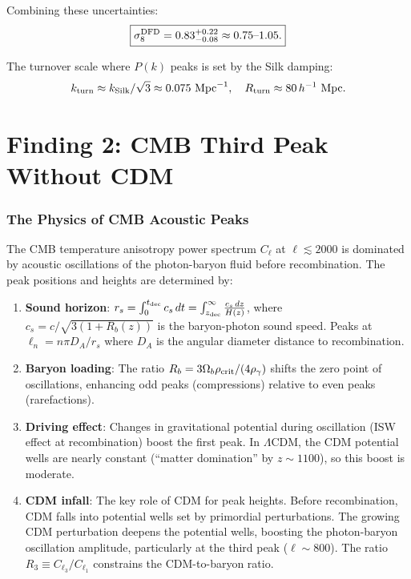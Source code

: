 \documentclass[11pt]{article}
\newcommand{\LCDM}{$\Lambda$CDM}
\newcommand{\kSilk}{k_{\rm Silk}}
\newcommand{\Ob}{\Omega_b}
\begin{document}
Combining these uncertainties:
\begin{equation}
\boxed{\sigma_8^{\rm DFD} = 0.83^{+0.22}_{-0.08}
\approx 0.75\text{--}1.05.}
\end{equation}

The turnover scale where $P(k)$ peaks is set by the Silk damping:
\begin{equation}
k_{\rm turn} \approx \kSilk/\sqrt{3} \approx 0.075\text{ Mpc}^{-1},
\quad R_{\rm turn} \approx 80\,h^{-1}\text{ Mpc}.
\end{equation}


\part{Finding 2: CMB Third Peak Without CDM}
\label{part:third-peak}

\section{The Physics of CMB Acoustic Peaks}

The CMB temperature anisotropy power spectrum $C_\ell$ at
$\ell \lesssim 2000$ is dominated by acoustic oscillations of the
photon-baryon fluid before recombination. The peak positions and
heights are determined by:

\begin{enumerate}
\item \textbf{Sound horizon}: $r_s = \int_0^{t_{\rm dec}} c_s\,dt
  = \int_{z_{\rm dec}}^\infty \frac{c_s\,dz}{H(z)}$, where
  $c_s = c/\sqrt{3(1+R_b(z))}$ is the baryon-photon sound speed.
  Peaks at $\ell_n = n\pi D_A/r_s$ where $D_A$ is the angular
  diameter distance to recombination.

\item \textbf{Baryon loading}: The ratio $R_b = 3\Ob\rho_{\rm crit}
  /(4\rho_\gamma)$ shifts the zero point of oscillations, enhancing
  odd peaks (compressions) relative to even peaks (rarefactions).

\item \textbf{Driving effect}: Changes in gravitational potential
  during oscillation (ISW effect at recombination) boost the first
  peak. In \LCDM, the CDM potential wells are nearly constant
  (``matter domination'' by $z \sim 1100$), so this boost is
  moderate.

\item \textbf{CDM infall}: The key role of CDM for peak heights.
  Before recombination, CDM falls into potential wells set by
  primordial perturbations. The growing CDM perturbation deepens
  the potential wells, boosting the photon-baryon oscillation
  amplitude, particularly at the third peak ($\ell \sim 800$).
  The ratio $R_3 \equiv C_{\ell_3}/C_{\ell_1}$ constrains the
  CDM-to-baryon ratio.
\end{enumerate}
\end{document}
